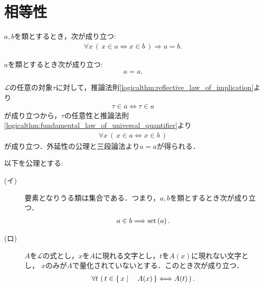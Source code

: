 \section{相等性}
	\begin{screen}
		\begin{axm}[外延性の公理]
			$a,b$を類とするとき，次が成り立つ:
			\begin{align}
				\forall x\, (\, x \in a  \Longleftrightarrow x \in b\, )
				\Longrightarrow a=b.
			\end{align}
		\end{axm}
	\end{screen}
	
	\begin{screen}
		\begin{thm}[任意の類は自分自身と等しい]\label{thm:any_class_equals_to_itself}
			$a$を類とするとき次が成り立つ:
			\begin{align}
				a = a.
			\end{align}
		\end{thm}
	\end{screen}
	
	\begin{prf}
		$\mathcal{L}$の任意の対象$\tau$に対して，推論法則\ref{logicalthm:reflective_law_of_implication}より
		\begin{align}
			\tau \in a \Longleftrightarrow \tau \in a
		\end{align}
		が成り立つから，$\tau$の任意性と推論法則\ref{logicalthm:fundamental_law_of_universal_quantifier}より
		\begin{align}
			\forall x\, (\, x \in a  \Longleftrightarrow x \in b\, )
		\end{align}
		が成り立つ．外延性の公理と三段論法より$a = a$が得られる．
		\QED
	\end{prf}
	
	\begin{screen}
		\begin{axm}[類の公理] 以下を公理とする:
			\begin{description}
				\item[(イ)] 要素となりうる類は集合である．つまり，$a,b$を類とするとき次が成り立つ．
					\begin{align}
						a \in b \Longrightarrow \operatorname*{set} \left(a\right).
					\end{align}
					
					
				\item[(ロ)] $A$を$\mathcal{L}$の式とし，$x$を$A$に現れる文字とし，$t$を$A(x)$に現れない文字とし，
					$x$のみが$A$で量化されていないとする．このとき次が成り立つ．
					\begin{align}
						\forall t\, \left(\, t \in \left\{\, x \mid \quad A(x)\, \right\} \Longleftrightarrow A(t)\, \right).
					\end{align}
			\end{description}
		\end{axm}
	\end{screen}
	
